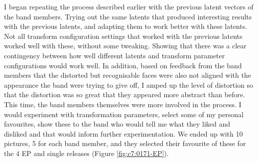 I began repeating the process described earlier with the previous latent vectors of the band members. 
Trying out the same latents that produced interesting results with the previous latents, and adapting them to work better with these latents. 
Not all transform configuration settings that worked with the previous latents worked well with these, without some tweaking. 
Showing that there was a clear contingency between how well different latents and transform parameter configurations would work well.
In addition, based on feedback from the band members that the distorted but recognisable faces were also not aligned with the appearance the band were trying to give off, I amped up the level of distortion so that the distortion was so great that they appeared more abstract than before. 
This time, the band members themselves were more involved in the process. I would experiment with transformation parameters, select some of my personal favourites, show these to the band who would tell me what they liked and disliked and that would inform further experimentation. 
We ended up with 10 pictures, 5 for each band member, and they selected their favourite of these for the 4 EP and single releases (Figure \ref{fig:c7:0171-EP}). 


